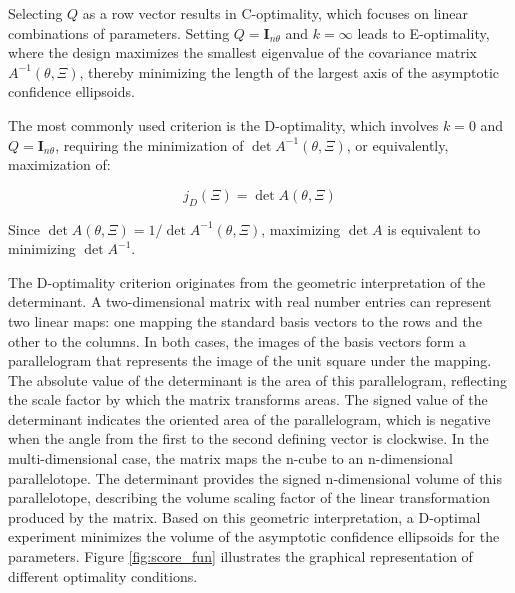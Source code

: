 \documentclass[../Article_Design_of_Experiment.tex]{subfiles}
\begin{document}
	Selecting $Q$ as a row vector results in C-optimality, which focuses on linear combinations of parameters. Setting $Q = \mathbf{I}_{n\theta}$ and $k = \infty$ leads to E-optimality, where the design maximizes the smallest eigenvalue of the covariance matrix $A^{-1}(\theta, \Xi)$, thereby minimizing the length of the largest axis of the asymptotic confidence ellipsoids.
	
	The most commonly used criterion is the D-optimality, which involves $k = 0$ and $Q = \mathbf{I}_{n\theta}$, requiring the minimization of $\det A^{-1}(\theta, \Xi)$, or equivalently, maximization of:
	
	{\footnotesize \begin{equation} j_D(\Xi) = \det A(\theta, \Xi) \end{equation} }
	
	Since $\det A(\theta, \Xi) = 1 / \det A^{-1}(\theta, \Xi)$, maximizing $\det A$ is equivalent to minimizing $\det A^{-1}$.
	
	The D-optimality criterion originates from the geometric interpretation of the determinant. A two-dimensional matrix with real number entries can represent two linear maps: one mapping the standard basis vectors to the rows and the other to the columns. In both cases, the images of the basis vectors form a parallelogram that represents the image of the unit square under the mapping. The absolute value of the determinant is the area of this parallelogram, reflecting the scale factor by which the matrix transforms areas. The signed value of the determinant indicates the oriented area of the parallelogram, which is negative when the angle from the first to the second defining vector is clockwise. In the multi-dimensional case, the matrix maps the n-cube to an n-dimensional parallelotope. The determinant provides the signed n-dimensional volume of this parallelotope, describing the volume scaling factor of the linear transformation produced by the matrix. Based on this geometric interpretation, a D-optimal experiment minimizes the volume of the asymptotic confidence ellipsoids for the parameters. Figure \ref{fig:score_fun} illustrates the graphical representation of different optimality conditions.
	
\end{document}
